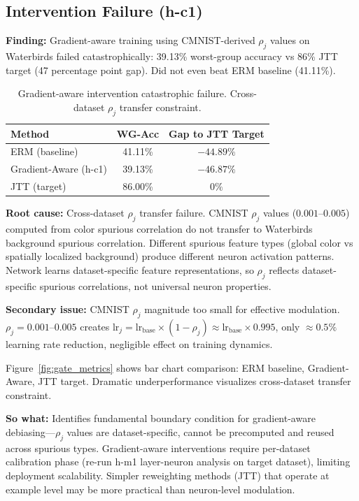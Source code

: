 \subsection{Intervention Failure (h-c1)}

\textbf{Finding:} Gradient-aware training using CMNIST-derived $\rho_j$ values on Waterbirds failed catastrophically: 39.13\% worst-group accuracy vs 86\% JTT target (47 percentage point gap). Did not even beat ERM baseline (41.11\%).

\begin{table}[h]
\centering
\begin{tabular}{lcc}
\toprule
\textbf{Method} & \textbf{WG-Acc} & \textbf{Gap to JTT Target} \\
\midrule
ERM (baseline) & 41.11\% & $-44.89\%$ \\
Gradient-Aware (h-c1) & 39.13\% & $-46.87\%$ \\
JTT (target) & 86.00\% & $0\%$ \\
\bottomrule
\end{tabular}
\caption{Gradient-aware intervention catastrophic failure. Cross-dataset $\rho_j$ transfer constraint.}
\end{table}

\textbf{Root cause:} Cross-dataset $\rho_j$ transfer failure. CMNIST $\rho_j$ values ($0.001$--$0.005$) computed from color spurious correlation do not transfer to Waterbirds background spurious correlation. Different spurious feature types (global color vs spatially localized background) produce different neuron activation patterns. Network learns dataset-specific feature representations, so $\rho_j$ reflects dataset-specific spurious correlations, not universal neuron properties.

\textbf{Secondary issue:} CMNIST $\rho_j$ magnitude too small for effective modulation. $\rho_j = 0.001$--$0.005$ creates $\text{lr}_j = \text{lr}_{\text{base}} \times (1 - \rho_j) \approx \text{lr}_{\text{base}} \times 0.995$, only $\approx 0.5\%$ learning rate reduction, negligible effect on training dynamics.

Figure~\ref{fig:gate_metrics} shows bar chart comparison: ERM baseline, Gradient-Aware, JTT target. Dramatic underperformance visualizes cross-dataset transfer constraint.

\textbf{So what:} Identifies fundamental boundary condition for gradient-aware debiasing---$\rho_j$ values are dataset-specific, cannot be precomputed and reused across spurious types. Gradient-aware interventions require per-dataset calibration phase (re-run h-m1 layer-neuron analysis on target dataset), limiting deployment scalability. Simpler reweighting methods (JTT) that operate at example level may be more practical than neuron-level modulation.

